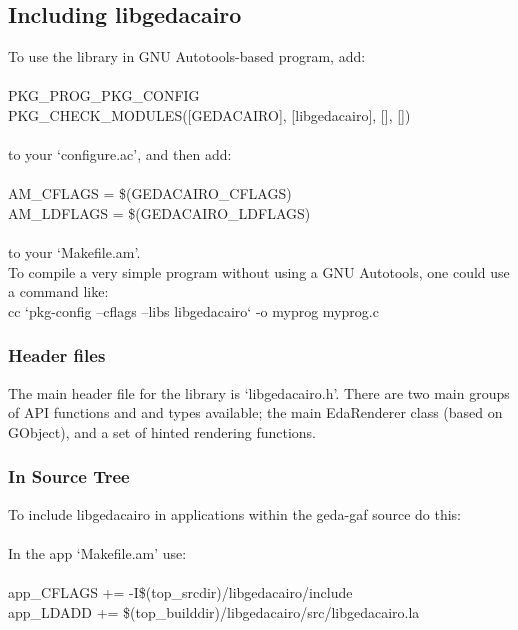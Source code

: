 \subsection*{Including libgedacairo}


  To use the library in GNU Autotools-based program, add: \\
\\
 PKG\_PROG\_PKG\_CONFIG\\
 PKG\_CHECK\_MODULES([GEDACAIRO], [libgedacairo], [], [])\\
\\
 to your `configure.ac', and then add: \\
\\
 AM\_CFLAGS = \$(GEDACAIRO\_CFLAGS)\\
 AM\_LDFLAGS = \$(GEDACAIRO\_LDFLAGS)\\
\\
 to your `Makefile.am'.\\



  To compile a very simple program without using a GNU Autotools, one could use a command like:\\

cc `pkg-config --cflags --libs libgedacairo` -o myprog myprog.c
\subsubsection*{Header files}
 The main header file for the library is `libgedacairo.h'. There are two main groups of API functions and and types available; the main EdaRenderer class (based on GObject), and a set of hinted rendering functions.
\subsubsection*{In Source Tree}
 To include libgedacairo in applications within the geda-gaf source do this:\\
\\
 In the app `Makefile.am' use:\\
\\
app\_CFLAGS += -I\$(top\_srcdir)/libgedacairo/include
\\
app\_LDADD += \$(top\_builddir)/libgedacairo/src/libgedacairo.la


